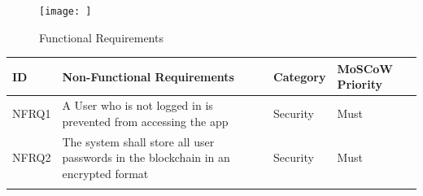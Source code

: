 \begin{figure}[htbp]
\centering
\texttt{[image: ]}
\caption{Functional Requirements}
\end{figure}

\begin{longtable}[]{@{}llll@{}}
\toprule
\begin{minipage}[b]{0.05\columnwidth}\raggedright\strut
ID\strut
\end{minipage} & \begin{minipage}[b]{0.63\columnwidth}\raggedright\strut
Non-Functional Requirements\strut
\end{minipage} & \begin{minipage}[b]{0.10\columnwidth}\raggedright\strut
Category\strut
\end{minipage} & \begin{minipage}[b]{0.11\columnwidth}\raggedright\strut
MoSCoW Priority\strut
\end{minipage}\tabularnewline
\midrule
\endhead
\begin{minipage}[t]{0.05\columnwidth}\raggedright\strut
NFRQ1\strut
\end{minipage} & \begin{minipage}[t]{0.63\columnwidth}\raggedright\strut
A User who is not logged in is prevented from accessing the app\strut
\end{minipage} & \begin{minipage}[t]{0.10\columnwidth}\raggedright\strut
Security\strut
\end{minipage} & \begin{minipage}[t]{0.11\columnwidth}\raggedright\strut
Must\strut
\end{minipage}\tabularnewline
\begin{minipage}[t]{0.05\columnwidth}\raggedright\strut
NFRQ2\strut
\end{minipage} & \begin{minipage}[t]{0.63\columnwidth}\raggedright\strut
The system shall store all user passwords in the blockchain in an
encrypted format\strut
\end{minipage} & \begin{minipage}[t]{0.10\columnwidth}\raggedright\strut
Security\strut
\end{minipage} & \begin{minipage}[t]{0.11\columnwidth}\raggedright\strut
Must\strut
\end{minipage}\tabularnewline
\begin{minipage}[t]{0.05\columnwidth}\raggedright\strut

\end{minipage}
\end{longtable}
